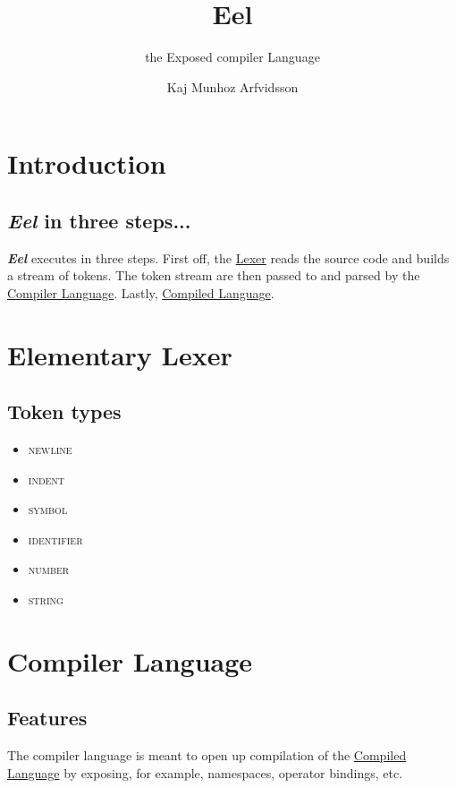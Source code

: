 \documentclass{texclass}
\title{Eel}
\subtitle{the Exposed compiler Language}
\author{Kaj Munhoz Arfvidsson}
\newcommand{\Eel}{\textbf{\textit{Eel}}\xspace}
\begin{document}
    \maketitle

    \section{Introduction}

        \subsection{\Eel in three steps...}
        \Eel executes in three steps. First off, the \href{sec:step_0}{Lexer} reads the source code and builds a stream of tokens. The token stream are then
        passed to and parsed by the \href{sec:step_1}{Compiler Language}. Lastly, \href{sec:step_2}{Compiled Language}.

    \break
    \section{Elementary Lexer}\label{sec:step_0}

        \subsection{Token types}
        \begin{itemize}
            \item \textsc{newline}
            \item \textsc{indent}
            \item \textsc{symbol}
            \item \textsc{identifier}
            \item \textsc{number}
            \item \textsc{string}
        \end{itemize}

    \break
    \section{Compiler Language}\label{sec:step_1}

        \subsection{Features}
        The compiler language is meant to open up compilation of the \href{sec:step_2}{Compiled Language} by exposing, for example, namespaces, operator bindings, etc.
\end{document}
